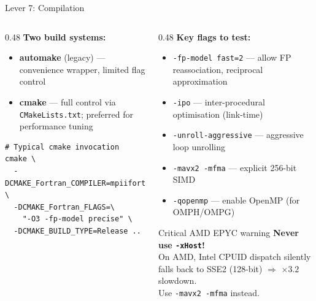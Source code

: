 \documentclass[aspectratio=169,10pt]{beamer}
\begin{document}
\begin{frame}[fragile,shrink=8]{Lever 7: Compilation}

  \begin{columns}[T]
    \begin{column}{0.48\textwidth}
      \textbf{Two build systems:}
      \begin{itemize}
        \item \textbf{automake} (legacy) --- convenience wrapper,
              limited flag control
        \item \textbf{cmake} --- full control via \texttt{CMakeLists.txt};
              preferred for performance tuning
      \end{itemize}

\begin{lstlisting}[language={}]
# Typical cmake invocation
cmake \
  -DCMAKE_Fortran_COMPILER=mpiifort \
  -DCMAKE_Fortran_FLAGS=\
    "-O3 -fp-model precise" \
  -DCMAKE_BUILD_TYPE=Release ..
\end{lstlisting}
    \end{column}
    \begin{column}{0.48\textwidth}
      \textbf{Key flags to test:}
      \begin{itemize}
        \item \texttt{-fp-model fast=2} --- allow FP reassociation,
              reciprocal approximation
        \item \texttt{-ipo} --- inter-procedural optimisation (link-time)
        \item \texttt{-unroll-aggressive} --- aggressive loop unrolling
        \item \texttt{-mavx2 -mfma} --- explicit 256-bit SIMD
        \item \texttt{-qopenmp} --- enable OpenMP (for OMPH/OMPG)
      \end{itemize}

      \vspace{0.3em}
      \begin{alertblock}{Critical AMD EPYC warning}
        \small
        \textbf{Never use \texttt{-xHost}!}\\
        On AMD, Intel CPUID dispatch silently falls back to SSE2
        (128-bit) $\Rightarrow$ $\times\!3.2$ slowdown.\\
        Use \texttt{-mavx2 -mfma} instead.
      \end{alertblock}
    \end{column}
  \end{columns}
\end{frame}
\end{document}
